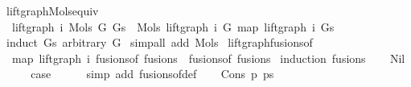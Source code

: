 \begin{isabellebody}
\endisatagproof
{\isafoldproof}%
%
\isadelimproof
\isanewline
%
\endisadelimproof
\isanewline
\isanewline
{}\isamarkupfalse%
\ lift{\isacharunderscore}{\kern0pt}graph{\isacharunderscore}{\kern0pt}Mols{}{\isacharunderscore}{\kern0pt}equiv{\isacharcolon}{\kern0pt}\isanewline
\ \ {\isachardoublequoteopen}lift{\isacharunderscore}{\kern0pt}graph\ i\ {\isacharparenleft}{\kern0pt}Mols{}\ G\ Gs{\isacharparenright}{\kern0pt}\ {\isacharequal}{\kern0pt}\ Mols{}\ {\isacharparenleft}{\kern0pt}lift{\isacharunderscore}{\kern0pt}graph\ i\ G{\isacharparenright}{\kern0pt}\ {\isacharparenleft}{\kern0pt}map\ {\isacharparenleft}{\kern0pt}lift{\isacharunderscore}{\kern0pt}graph\ i{\isacharparenright}{\kern0pt}\ Gs{\isacharparenright}{\kern0pt}{\isachardoublequoteclose}\isanewline
%
\isadelimproof
%
\endisadelimproof
%
\isatagproof
{}\isamarkupfalse%
\ {\isacharparenleft}{\kern0pt}induct\ Gs\ arbitrary{\isacharcolon}{\kern0pt}\ G{\isacharparenright}{\kern0pt}\isanewline
{}\isamarkupfalse%
\ {\isacharparenleft}{\kern0pt}simp{\isacharunderscore}{\kern0pt}all\ add{\isacharcolon}{\kern0pt}\ Mols{}{\isacharparenright}{\kern0pt}%
\endisatagproof
{\isafoldproof}%
%
\isadelimproof
\isanewline
%
\endisadelimproof
\isanewline
\isanewline
{}\isamarkupfalse%
\ lift{\isacharunderscore}{\kern0pt}graph{\isacharunderscore}{\kern0pt}fusions{\isacharunderscore}{\kern0pt}of{\isacharcolon}{\kern0pt}\isanewline
\ \ {\isachardoublequoteopen}map\ {\isacharparenleft}{\kern0pt}lift{\isacharunderscore}{\kern0pt}graph\ i{\isacharparenright}{\kern0pt}\ {\isacharparenleft}{\kern0pt}fusions{\isacharunderscore}{\kern0pt}of\ fusions{\isacharparenright}{\kern0pt}\ {\isacharequal}{\kern0pt}\ fusions{\isacharunderscore}{\kern0pt}of\ fusions{\isachardoublequoteclose}\isanewline
%
\isadelimproof
%
\endisadelimproof
%
\isatagproof
{}\isamarkupfalse%
\ {\isacharparenleft}{\kern0pt}induction\ fusions{\isacharparenright}{\kern0pt}\isanewline
\ \ \isamarkupfalse%
\ Nil\isanewline
\ \ \isamarkupfalse%
\ \isamarkupfalse%
\ {\isacharquery}{\kern0pt}case\isanewline
\ \ \ \ \isamarkupfalse%
\ {\isacharparenleft}{\kern0pt}simp\ add{\isacharcolon}{\kern0pt}\ fusions{\isacharunderscore}{\kern0pt}of{\isacharunderscore}{\kern0pt}def{\isacharparenright}{\kern0pt}\isanewline
{}\isamarkupfalse%
\isanewline
\ \ \isamarkupfalse%
\ {\isacharparenleft}{\kern0pt}Cons\ p\ ps{\isacharparenright}{\kern0pt}\isanewline

\end{isabellebody}
